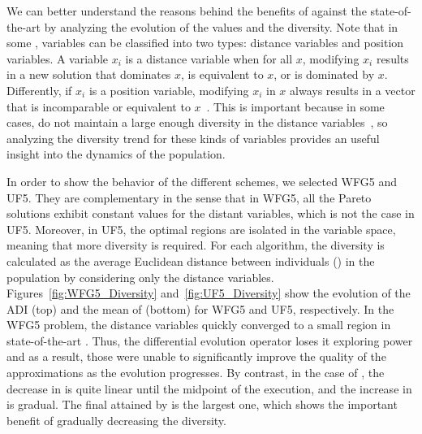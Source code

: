 We can better understand the reasons behind the benefits of \AVSDMOEAD{} against the state-of-the-art \MOEAS{}
by analyzing the evolution of the \HV{} values and the diversity.
%
Note that in some \MOPS{}, variables can be classified into two types: 
distance variables and position variables.
%
A variable $x_i$ is a distance variable when for all $x$, modifying $x_i$ results in a new solution 
that dominates $x$, is equivalent to $x$, or is dominated by $x$.
%
Differently, if $x_i$ is a position variable, modifying $x_i$ in $x$ always results in a vector that is 
incomparable or equivalent to $x$~\cite{huband2006review}.
%
This is important because in some cases, \MOEAS{} do not maintain a large enough diversity in the distance
variables~\cite{castillo2017multi}, so analyzing the diversity trend for these kinds of variables provides an useful
insight into the dynamics of the population.

In order to show the behavior of the different schemes, we selected WFG5 and UF5.
%
They are complementary in the sense that in WFG5, all the Pareto solutions exhibit constant 
values for the distant variables, which is not the case in UF5.
%
Moreover, in UF5, the optimal regions are isolated in the variable 
space, meaning that more diversity is required.
%
For each algorithm, the diversity is calculated as the average Euclidean distance between individuals (\ADI{}) in the population 
by considering only the distance variables.
%
Figures~\ref{fig:WFG5_Diversity} and~\ref{fig:UF5_Diversity} show the evolution of the ADI (top) and the mean of \HV{} (bottom) 
for WFG5 and UF5, respectively.
%
In the WFG5 problem, the distance variables quickly converged to a small region 
in state-of-the-art \MOEAS{}.
%
Thus, the differential evolution operator loses it exploring power and as a result,
those \MOEAS{} were unable to significantly improve the quality of the approximations as the
evolution progresses.
%
By contrast, in the case of \AVSDMOEAD{}, the decrease in \ADI{} is quite linear until the midpoint of the execution, and
the increase in \HV{} is gradual.
%
The final \HV{} attained by \AVSDMOEAD{} is the largest one, which shows the important benefit
of gradually decreasing the diversity.


